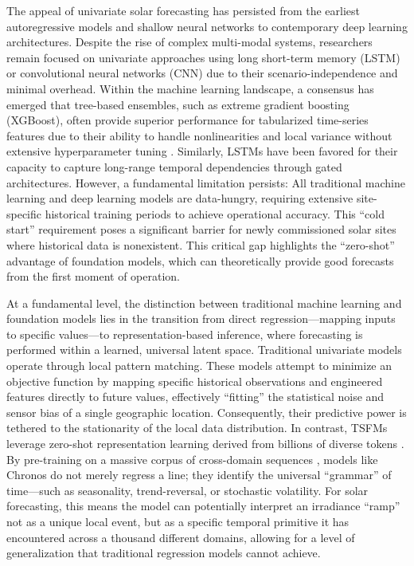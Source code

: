 \documentclass[number, 3p, 10pt, times]{elsarticle}
\begin{document}
The appeal of univariate solar forecasting has persisted from the earliest autoregressive models \citep{REIKARD2009342} and shallow neural networks \citep{PEDRO20122017} to contemporary deep learning architectures. Despite the rise of complex multi-modal systems, researchers remain focused on univariate approaches using long short-term memory (LSTM) \citep{DIAZBEDOYA2023117618} or convolutional neural networks (CNN) \citep{AITMANSOUR2024101886} due to their scenario-independence and minimal overhead. Within the machine learning landscape, a consensus has emerged that tree-based ensembles, such as extreme gradient boosting (XGBoost), often provide superior performance for tabularized time-series features due to their ability to handle nonlinearities and local variance without extensive hyperparameter tuning \citep{YAGLI2019487}. Similarly, LSTMs have been favored for their capacity to capture long-range temporal dependencies through gated architectures. However, a fundamental limitation persists: All traditional machine learning and deep learning models are data-hungry, requiring extensive site-specific historical training periods to achieve operational accuracy. This ``cold start'' requirement poses a significant barrier for newly commissioned solar sites where historical data is nonexistent. This critical gap highlights the ``zero-shot'' advantage of foundation models, which can theoretically provide good forecasts from the first moment of operation.

At a fundamental level, the distinction between traditional machine learning and foundation models lies in the transition from direct regression---mapping inputs to specific values---to representation-based inference, where forecasting is performed within a learned, universal latent space. Traditional univariate models operate through local pattern matching. These models attempt to minimize an objective function by mapping specific historical observations and engineered features directly to future values, effectively ``fitting'' the statistical noise and sensor bias of a single geographic location. Consequently, their predictive power is tethered to the stationarity of the local data distribution. In contrast, TSFMs leverage zero-shot representation learning derived from billions of diverse tokens \citep{Ansari2024, Das2024}. By pre-training on a massive corpus of cross-domain sequences \citep{Goswami2024}, models like Chronos do not merely regress a line; they identify the universal ``grammar'' of time---such as seasonality, trend-reversal, or stochastic volatility. For solar forecasting, this means the model can potentially interpret an irradiance ``ramp'' not as a unique local event, but as a specific temporal primitive it has encountered across a thousand different domains, allowing for a level of generalization that traditional regression models cannot achieve. 
\end{document}
